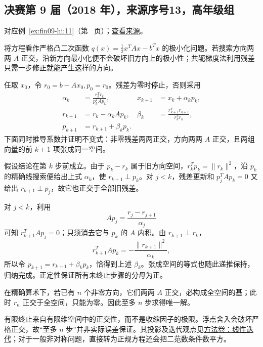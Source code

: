 \documentclass[UTF8,12pt,a4paper,fontset=fandol]{ctexart}
\begin{document}
\subsection{决赛第 9 届（2018 年），来源序号13，高年级组}\label{ans:fin09-hi:11}\label{pr:fin09-hi:11}

对应例~\ref{ex:fin09-hi:11}（第~\pageref{ex:fin09-hi:11} 页）；\href{https://github.com/lzxcr/cmc-mathematics/blob/64916fa1fdbc3e444a652eca204d5669058ee321/src/problems/finals/09/13.md}{查看来源}。

\begin{solve}

将方程看作严格凸二次函数 $q(x)=\frac12x^TAx-b^Tx$ 的极小化问题。若搜索方向两两 $A$ 正交，沿新方向最小化便不会破坏旧方向上的极小性；共轭梯度法利用残差只需一步修正就能产生这样的方向。

任取 $x_0$，令 $r_0=b-Ax_0,p_0=r_0$。残差为零时停止，否则采用
\[
\begin{aligned}
\alpha_k&=\frac{r_k^Tr_k}{p_k^TAp_k},&x_{k+1}&=x_k+\alpha_kp_k,\\
r_{k+1}&=r_k-\alpha_kAp_k,&\beta_k&=\frac{r_{k+1}^Tr_{k+1}}{r_k^Tr_k},\\
p_{k+1}&=r_{k+1}+\beta_kp_k.
\end{aligned}
\]
下面同时推导系数并证明不变式：非零残差两两正交，方向两两 $A$ 正交，且两组向量的前 $k+1$ 项张成同一空间。

假设结论在第 $k$ 步前成立。由于 $p_k-r_k$ 属于旧方向空间，$r_k^Tp_k=\|r_k\|^2$，沿 $p_k$ 的精确线搜索便给出上式 $\alpha_k$，使 $r_{k+1}\perp p_k$。对 $j<k$，残差更新和 $p_j^TAp_k=0$ 又给出 $r_{k+1}\perp p_j$，故它也正交于全部旧残差。

对 $j<k$，利用
\[
Ap_j=\frac{r_j-r_{j+1}}{\alpha_j}
\]
可知 $r_{k+1}^TAp_j=0$；只须消去它与 $p_k$ 的 $A$ 内积。由 $r_{k+1}\perp r_k$，
\[
r_{k+1}^TAp_k=-\frac{\|r_{k+1}\|^2}{\alpha_k},
\]
所以令 $p_{k+1}=r_{k+1}+\beta_kp_k$，恰得到上述 $\beta_k$。张成空间的等式也随此递推保持，归纳完成。正定性保证所有未终止步骤的分母为正。

在精确算术下，若已有 $n$ 个非零方向，它们两两 $A$ 正交，必构成全空间的基；此时 $r_n$ 正交于全空间，只能为零。因此至多 $n$ 步求得唯一解。

\end{solve}

\begin{remark}[方法与条件]

有限终止来自有限维空间中的正交性，而不是收缩因子的极限。浮点舍入会破坏严格正交，故“至多 $n$ 步”并非实际误差保证。其投影及迭代观点见\hyperref[app:linear-iteration]{方法卷：线性迭代}；对于一般非对称问题，直接转为正规方程还会把二范数条件数平方。

\end{remark}
\end{document}
